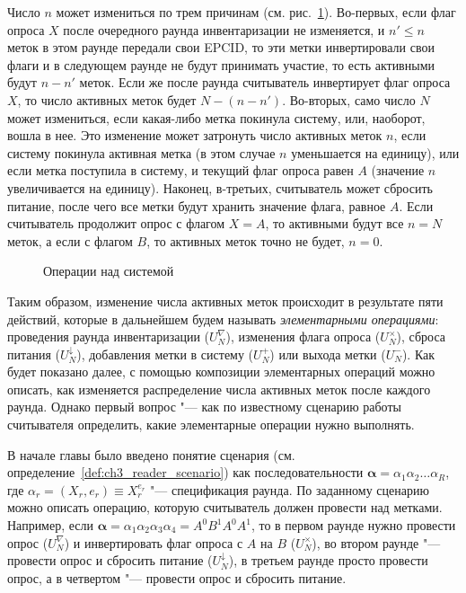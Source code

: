 Число $n$ может измениться по трем причинам (см. рис.~\ref{fig:ch3_operations}). Во-первых, если флаг опроса $X$ после очередного раунда инвентаризации не изменяется, и $n' \leqslant n$ меток в этом раунде передали свои EPCID, то эти метки инвертировали свои флаги и в следующем раунде не будут принимать участие, то есть активными будут $n - n'$ меток. Если же после раунда считыватель инвертирует флаг опроса $X$, то число активных меток будет $N - (n - n')$. Во-вторых, само число $N$ может измениться, если какая-либо метка покинула систему, или, наоборот, вошла в нее. Это изменение может затронуть число активных меток $n$, если систему покинула активная метка (в этом случае $n$ уменьшается на единицу), или если метка поступила в систему, и текущий флаг опроса равен $A$ (значение $n$ увеличивается на единицу). Наконец, в-третьих, считыватель может сбросить питание, после чего все метки будут хранить значение флага, равное $A$. Если считыватель продолжит опрос с флагом $X = A$, то активными будут все $n = N$ меток, а если с флагом $B$, то активных меток точно не будет, $n = 0$.

\begin{figure}[htb]
  \caption{Операции над системой}
  \label{fig:ch3_operations}
\end{figure}

Таким образом, изменение числа активных меток происходит в результате пяти действий, которые в дальнейшем будем называть \textit{элементарными операциями}: проведения раунда инвентаризации ($U_N^\nabla$), изменения флага опроса ($U_N^\times$), сброса питания ($U_N^\downarrow$), добавления метки в систему ($U_N^+$) или выхода метки ($U_N^-$). Как будет показано далее, с помощью композиции элементарных операций можно описать, как изменяется распределение числа активных меток после каждого раунда. Однако первый вопрос "--- как по известному сценарию работы считывателя определить, какие элементарные операции нужно выполнять.

В начале главы было введено понятие сценария (см. определение~\ref{def:ch3_reader_scenario}) как последовательности $\bm{\alpha} = \alpha_1 \alpha_2 \dots \alpha_R$, где $\alpha_r = (X_r, e_r) \equiv X_r^{e_r}$ "--- спецификация раунда. По заданному сценарию можно описать операцию, которую считыватель должен провести над метками. Например, если $\bm{\alpha} = \alpha_1 \alpha_2 \alpha_3 \alpha_4 = A^0 B^1 A^0 A^1$, то в первом раунде нужно провести опрос ($U_N^\nabla$) и инвертировать флаг опроса с $A$ на $B$ ($U_N^\times$), во втором раунде "--- провести опрос и сбросить питание ($U_N^\downarrow$), в третьем раунде просто провести опрос, а в четвертом "--- провести опрос и сбросить питание.

